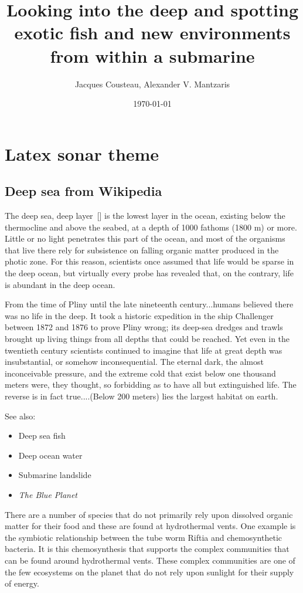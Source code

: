 \documentclass[12pt,twocolumn]{article}
\title{Looking into the deep and spotting exotic fish and new environments from within a submarine}
\author{Jacques Cousteau, Alexander V. Mantzaris}
\date{\today}
\begin{document}
\maketitle



\section{Latex sonar theme}

\subsection{Deep sea from Wikipedia}
The deep sea, deep layer~[\cite{gortney2010department}] is the lowest layer in the ocean, existing below the thermocline and above the seabed, at a depth of 1000 fathoms (1800 m) or more. Little or no light penetrates this part of the ocean, and most of the organisms that live there rely for subsistence on falling organic matter produced in the photic zone. For this reason, scientists once assumed that life would be sparse in the deep ocean, but virtually every probe has revealed that, on the contrary, life is abundant in the deep ocean.

    From the time of Pliny until the late nineteenth century...humans believed there was no life in the deep. It took a historic expedition in the ship Challenger between 1872 and 1876 to prove Pliny wrong; its deep-sea dredges and trawls brought up living things from all depths that could be reached. Yet even in the twentieth century scientists continued to imagine that life at great depth was insubstantial, or somehow inconsequential. The eternal dark, the almost inconceivable pressure, and the extreme cold that exist below one thousand meters were, they thought, so forbidding as to have all but extinguished life. The reverse is in fact true....(Below 200 meters) lies the largest habitat on earth.

 See also:
\begin{itemize}
\item Deep sea fish
\item Deep ocean water
\item Submarine landslide
\item \emph{The Blue Planet}
\end{itemize}

There are a number of species that do not primarily rely upon dissolved organic matter for their food and these are found at hydrothermal vents. One example is the symbiotic relationship between the tube worm Riftia and chemosynthetic bacteria. It is this chemosynthesis that supports the complex communities that can be found around hydrothermal vents. These complex communities are one of the few ecosystems on the planet that do not rely upon sunlight for their supply of energy.
\end{document}
